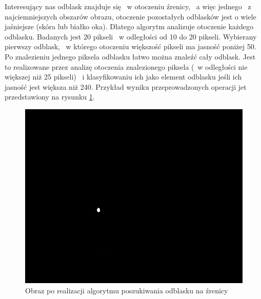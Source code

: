 Interesujący nas odblask znajduje się ~w otoczeniu źrenicy, ~a więc jednego ~z najciemniejszych obszarów obrazu, otoczenie pozostałych odblasków jest o wiele jaśniejsze (skóra lub białko oka). Dlatego algorytm analizuje otoczenie każdego odblasku. Badanych jest 20 pikseli ~w odległości od 10 do 20 pikseli. Wybierany pierwszy odblask, ~w którego otoczeniu większość pikseli ma jasność poniżej 50. Po znalezieniu jednego piksela odblasku łatwo można znaleźć cały odblask. Jest to realizowane przez analizę otoczenia znalezionego piksela (~w odległości nie większej niż 25 pikseli) ~i klasyfikowaniu ich jako element odblasku jeśli ich jasność jest większa niż 240. Przykład wyniku przeprowadzonych operacji jet przedstawiony na rysunku \ref{fig:dobryOdblask}.
\begin{figure}
\begin{center}
\includegraphics[scale=0.5]{odblask.jpg}
\caption{Obraz po realizacji algorytmu poszukiwania odblasku na źrenicy}
\label{fig:dobryOdblask}
\end{center}
\end{figure}

